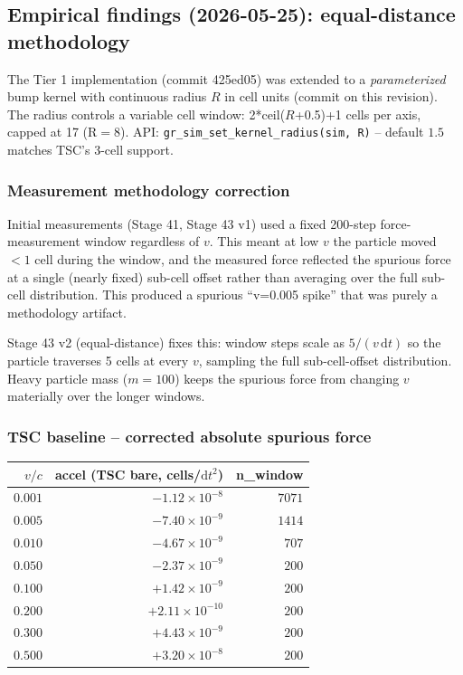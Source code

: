 \documentclass[11pt,a4paper]{article}
\newcommand{\dd}{\mathrm{d}}
\begin{document}
\subsection{Empirical findings (2026-05-25): equal-distance methodology}
\label{sec:kernel_v38_findings}

The Tier 1 implementation (commit 425ed05) was extended to a
\emph{parameterized} bump kernel with continuous radius $R$ in cell
units (commit on this revision).  The radius controls a variable
cell window: 2*ceil($R$+0.5)+1 cells per axis, capped at 17 (R$=$8).
API: \texttt{gr\_sim\_set\_kernel\_radius(sim, R)} -- default $1.5$
matches TSC's 3-cell support.

\subsubsection*{Measurement methodology correction}

Initial measurements (Stage 41, Stage 43 v1) used a fixed 200-step
force-measurement window regardless of $v$.  This meant at low $v$
the particle moved $<1$ cell during the window, and the measured
force reflected the spurious force at a single (nearly fixed)
sub-cell offset rather than averaging over the full sub-cell
distribution.  This produced a spurious ``v=0.005 spike'' that was
purely a methodology artifact.

Stage 43 v2 (equal-distance) fixes this: window steps scale as
$5/(v\,\dd t)$ so the particle traverses 5 cells at every $v$,
sampling the full sub-cell-offset distribution.  Heavy particle
mass ($m=100$) keeps the spurious force from changing $v$
materially over the longer windows.

\subsubsection*{TSC baseline -- corrected absolute spurious force}

\begin{center}
\begin{tabular}{rrr}
\toprule
$v/c$ & accel (TSC bare, cells/$\dd t^2$) & n\_window \\
\midrule
$0.001$ & $-1.12\times10^{-8}$ & $7071$ \\
$0.005$ & $-7.40\times10^{-9}$ & $1414$ \\
$0.010$ & $-4.67\times10^{-9}$ & $707$  \\
$0.050$ & $-2.37\times10^{-9}$ & $200$  \\
$0.100$ & $+1.42\times10^{-9}$ & $200$  \\
$0.200$ & $+2.11\times10^{-10}$ & $200$ \\
$0.300$ & $+4.43\times10^{-9}$ & $200$  \\
$0.500$ & $+3.20\times10^{-8}$ & $200$  \\
\bottomrule
\end{tabular}
\end{center}
\end{document}
